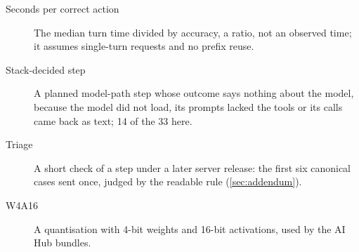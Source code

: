 \documentclass[11pt]{article}
\begin{document}
\begin{description}
\item[Seconds per correct action] The median turn time divided by accuracy, a ratio, not an observed time; it assumes single-turn requests and no prefix reuse.
\item[Stack-decided step] A planned model-path step whose outcome says nothing about the model, because the model did not load, its prompts lacked the tools or its calls came back as text; 14 of the 33 here.
\item[Triage] A short check of a step under a later server release: the first six canonical cases sent once, judged by the readable rule (\cref{sec:addendum}).
\item[W4A16] A quantisation with 4-bit weights and 16-bit activations, used by the AI Hub bundles.
\end{description}
\end{document}
